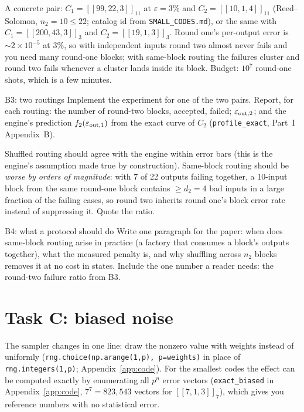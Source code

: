\documentclass[11pt]{article}
\newcommand{\eps}{\varepsilon}
\newcommand{\code}[1]{\texttt{#1}}
\begin{document}
A concrete pair: $C_1 = [[99,22,3]]_{11}$ at $\eps=3\%$ and $C_2 = [[10,1,4]]_{11}$
(Reed--Solomon, $n_2=10\le22$; catalog id from \code{SMALL\_CODES.md}), or the same
with $C_1=[[200,43,3]]_3$ and $C_2 = [[19,1,3]]_3$. Round one's per-output error is
$\sim 2\times10^{-5}$ at $3\%$, so with independent inputs round two almost never
fails and you need many round-one blocks; with same-block routing the failures
cluster and round two fails whenever a cluster lands inside its block. Budget: $10^7$
round-one shots, which is a few minutes.

\begin{exercise}{B3: two routings}
Implement the experiment for one of the two pairs. Report, for each routing: the
number of round-two blocks, accepted, failed; $\eps_{\rm out,2}$; and the engine's
prediction $f_2(\eps_{\rm out,1})$ from the exact curve of $C_2$
(\code{profile\_exact}, Part~I Appendix~B).
\end{exercise}
\begin{checkbox}
Shuffled routing should agree with the engine within error bars (this is the
engine's assumption made true by construction). Same-block routing should be
\emph{worse by orders of magnitude}: with 7 of 22 outputs failing together, a
10-input block from the same round-one block contains $\ge d_2=4$ bad inputs in a
large fraction of the failing cases, so round two inherits round one's block error
rate instead of suppressing it. Quote the ratio.
\end{checkbox}

\begin{exercise}{B4: what a protocol should do}
Write one paragraph for the paper: when does same-block routing arise in practice
(a factory that consumes a block's outputs together), what the measured penalty is,
and why shuffling across $n_2$ blocks removes it at no cost in states. Include the
one number a reader needs: the round-two failure ratio from B3.
\end{exercise}

\section{Task C: biased noise}
\label{sec:C}

The sampler changes in one line: draw the nonzero value with weights instead of
uniformly (\code{rng.choice(np.arange(1,p), p=weights)} in place of
\code{rng.integers(1,p)}; Appendix~\ref{app:code}). For the smallest codes the effect
can be computed exactly by enumerating all $p^n$ error vectors
(\code{exact\_biased} in Appendix~\ref{app:code}, $7^7 = 823{,}543$ vectors for
$[[7,1,3]]_7$), which gives you reference numbers with no statistical error.
\end{document}
